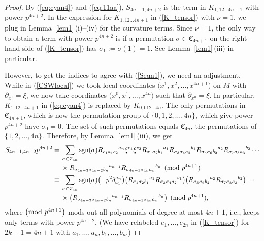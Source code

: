 \documentclass[10pt,a4paper]{amsart}
\numberwithin{equation}{section}
\theoremstyle{definition}
\newcommand{\sgn}{{\rm sgn}}
\newcommand{\barcurvature}[2]{R_{#1}{}^{#2}}
\begin{document}
\begin{proof}
By (\ref{eq:cyan4}) and (\ref{eq:11aa}), $S_{4n+1,4n+2}$ is the term in $K_{1,12\dots 4n+1}$ with power $p^{4n+2}$. In the expression for $K_{1,12\dots 4n+1}$ in (\ref{K_tensor}) with $\nu=1$, we plug in Lemma~\ref{lem1}\,(i)--(iv) for the curvature terms.
Since $\nu=1$, the only way to obtain a term with power $p^{4n+2}$
is if a permutation $\sigma\in \mathfrak{C}_{4n+1}$ on the right-hand side of (\ref{K_tensor}) has $\sigma_1 :=\sigma(1) =1$. See Lemma~\ref{lem1}\,(iii) in particular.

However, to get the indices to agree with (\ref{Seqn1}), we need an adjustment. While in (\ref{CSWlocal}) we took local coordinates $\bigl(x^1,x^2,\dots, x^{4n+1}\bigr)$ on $M$ with $\partial_{x^1} = \xi$, we now take coordinates $\bigl(x^0, x^1,\dots, x^{4n}\bigr)$ such that
$\partial_{x^0} = \xi$. In particular, $K_{1, 1 2\dots 4n+1}$ in (\ref{eq:cyan4}) is replaced by
$K_{0, 01 2\dots 4n}$. The only permutations in $\mathfrak{C}_{4n+1}$, which is now the permutation group of $\{0,1,2,\dots,4n\}$, which give power $p^{4n+2}$ have $\sigma_0=0$. The set of such permutations equals $\mathfrak{C}_{4n}$, the permutations of~$\{1,2,\dots,4n\}$. Therefore, by Lemma~\ref{lem1}\,(iii), we get
\begin{align*}
S_{4n+1,4n+2}p^{4n+2}
={}& \sum_{\sigma\in \mathfrak{C}_{4n}}
 \sgn(\sigma)
\barcurvature{c_1 a_1 c_2}{a_{n}}
\xi^{c_1} \xi^{c_2}
\barcurvature{\sigma_1 \sigma_2 b_1}{a_1}
\barcurvature{\sigma_3 \sigma_4 a_2}{b_1}
\barcurvature{\sigma_5 \sigma_6 b_2}{a_2}
\barcurvature{\sigma_7 \sigma_8 a_3}{b_2}
\cdots \\
 &\times
\barcurvature{\sigma_{4n-3} \sigma_{4n-2} b_n}{a_{n-1}}
\barcurvature{\sigma_{4n-1} \sigma_{4n} a_{n}}{b_n}
\pmod{p^{4n+1}}
\\
\equiv{}& \sum_{\sigma\in \mathfrak{C}_{4n}}
 \sgn(\sigma)
\bigl(-p^2 \delta_{a_1}^{a_{n}} \bigr)
\bigl(\barcurvature{\sigma_1 \sigma_2 b_1}{a_1}
\barcurvature{\sigma_3 \sigma_4 a_2}{b_1}\bigr)
\bigl(\barcurvature{\sigma_5 \sigma_6 b_2}{a_2}
\barcurvature{\sigma_7 \sigma_8 a_3}{b_2}\bigr)
\cdots \\
 &\times
\bigl(\barcurvature{\sigma_{4n-3} \sigma_{4n-2} b_{n}}{a_{n-1}}
\barcurvature{\sigma_{4n-1} \sigma_{4n} a_n}{b_{n}} \bigr)
\pmod{p^{4n+1}},
 \end{align*}
where
$\bigl({\rm mod}\ p^{4n+1}\bigr)$ mods out all polynomials of degree at most $4n+1$, i.e.,
keeps only terms with power $p^{4n+2}$. (We have relabeled $e_1,\dots,e_{2n}$ in
(\ref{K_tensor}) for $2k-1 = 4n+1$ with $a_1,\dots,a_n, b_1,\dots, b_n$.)


\end{proof}
\end{document}
